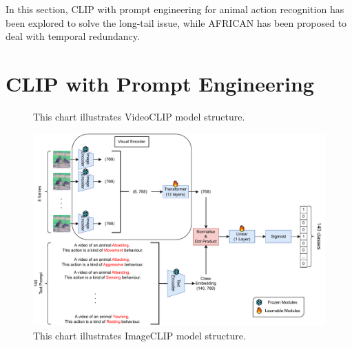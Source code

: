 In this section, CLIP with prompt engineering for animal action recognition has been explored to solve the long-tail issue, while AFRICAN has been proposed to deal with temporal redundancy. 

\section{CLIP with Prompt Engineering}

\begin{figure}[ht]
    \centering
    \caption[VideoCLIP model structure]{This chart illustrates VideoCLIP model structure.}
    \label{fig:modelstructure_vc}
\end{figure}

\begin{figure}[ht]
    \centering
    \includegraphics[width=1.0\textwidth]{assets/charts/3_2_ModelStructureIC}
    \caption[ImageCLIP Model Structure]{This chart illustrates ImageCLIP model structure.}
    \label{fig:modelstructure_ic}
\end{figure}

